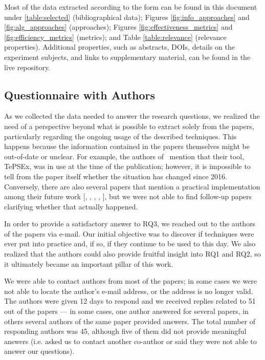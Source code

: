 Most of the data extracted according to the form can be found in this document under \autoref{table:selected} (bibliographical data); Figures \ref{fig:info_approaches} and \ref{fig:alg_approaches} (approaches); Figures \ref{fig:effectiveness_metrics} and \ref{fig:efficiency_metrics} (metrics); and Table \ref{table:relevance} (\rea relevance properties).
Additional properties, such as abstracts, DOIs, details on the experiment subjects, and links to supplementary material, can be found in the live repository.

%

\subsection{Questionnaire with Authors}
\label{subsec:questionnaires}

As we collected the data needed to answer the research questions, we realized the need of a perspective beyond what is possible to extract solely from the papers, particularly regarding the ongoing usage of the described techniques.
This happens because the information contained in the papers themselves might be out-of-date or unclear.
For example, the authors of~ mention that their tool, TePSEx, was in use at the time of the publication; however, it is impossible to tell from the paper itself whether the situation has changed since 2016.
Conversely, there are also several papers that mention a practical implementation among their future work [, 
, 
, 
, 
], but we were not able to find follow-up papers clarifying whether that actually happened.

In order to provide a satisfactory answer to RQ3, we reached out to the authors of the papers via e-mail.
Our initial objective was to discover if techniques were ever put into practice and, if so, if they continue to be used to this day.
We also realized that the authors could also provide fruitful insight into RQ1 and RQ2, so it ultimately became an important pillar of this work.

We were able to contact authors from most of the papers; in some cases we were not able to locate the author's e-mail address, or the address is no longer valid.
The authors were given 12 days to respond and we received replies related to 51 out of the \numpapers papers --- in some cases, one author answered for several papers, in others several authors of the same paper provided answers.
The total number of responding authors was 45, although five of them did not provide meaningful answers (i.e. asked us to contact another co-author or said they were not able to answer our questions).

